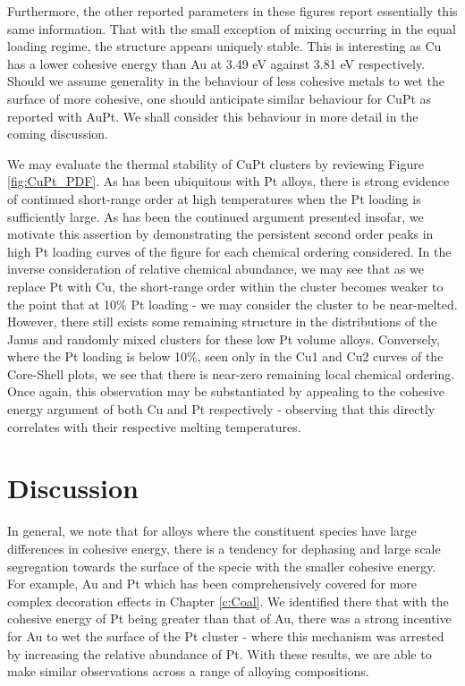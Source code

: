 Furthermore, the other reported parameters in these figures report essentially this same information. That with the small exception of mixing occurring in the equal loading regime, the structure appears uniquely stable. This is interesting as Cu has a lower cohesive energy than Au at 3.49 eV against 3.81 eV respectively. Should we assume generality in the behaviour of less cohesive metals to wet the surface of more cohesive, one should anticipate similar behaviour for CuPt as reported with AuPt. We shall consider this behaviour in more detail in the coming discussion. 

We may evaluate the thermal stability of CuPt clusters by reviewing Figure \ref{fig:CuPt_PDF}. As has been ubiquitous with Pt alloys, there is strong evidence of continued short-range order at high temperatures when the Pt loading is sufficiently large. As has been the continued argument presented insofar, we motivate this assertion by demonstrating the persistent second order peaks in high Pt loading curves of the figure for each chemical ordering considered. In the inverse consideration of relative chemical abundance, we may see that as we replace Pt with Cu, the short-range order within the cluster becomes weaker to the point that at 10\% Pt loading - we may consider the cluster to be near-melted. However, there still exists some remaining structure in the distributions of the Janus and randomly mixed clusters for these low Pt volume alloys. Conversely, where the Pt loading is below 10\%, seen only in the Cu1 and Cu2 curves of the Core-Shell plots, we see that there is near-zero remaining local chemical ordering. Once again, this observation may be substantiated by appealing to the cohesive energy argument of both Cu and Pt respectively - observing that this directly correlates with their respective melting temperatures.

\section{Discussion}
\label{sec:alloy_discuss}
In general, we note that for alloys where the constituent species have large differences in cohesive energy, there is a tendency for dephasing and large scale segregation towards the surface of the specie with the smaller cohesive energy. For example, Au and Pt which has been comprehensively covered for more complex decoration effects in Chapter \ref{c:Coal}. We identified there that with the cohesive energy of Pt being greater than that of Au, there was a strong incentive for Au to wet the surface of the Pt cluster - where this mechanism was arrested by increasing the relative abundance of Pt. With these results, we are able to make similar observations across a range of alloying compositions.

